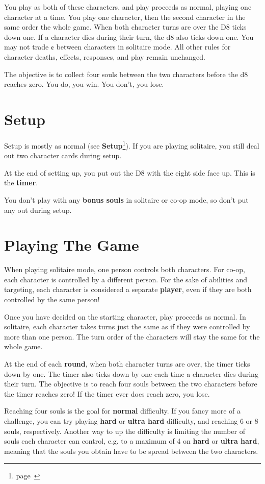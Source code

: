 \documentclass[
  fontsize=10pt,
  paper=a5,
  version=last,
  chapterprefix=true,
  bindingoffset=5mm,
  ]{scrbook}
\begin{document}
    You play as both of these characters, and play proceeds as normal, playing one character at a time. You play one character, then the second character in the same order the whole game. When both character turns are over the D8 ticks down one. If a character dies during their turn, the d8 also ticks down one. You may not trade ¢ between characters in solitaire mode. All other rules for character deaths, effects, responses, and play remain unchanged.

    The objective is to collect four souls between the two characters before the d8 reaches zero. You do, you win. You don’t, you lose.
    \section{Setup}
    Setup is mostly as normal (see \textbf{Setup}\footnote{page~\pageref{setup}}). If you are playing solitaire, you still deal out two character cards during setup.

    At the end of setting up, you put out the D8 with the eight side face up. This is the \textbf{timer}.

    You don’t play with any \textbf{bonus souls} in solitaire or co-op mode, so don’t put any out during setup.
    \section{Playing The Game}
    When playing solitaire mode, one person controls both characters. For co-op, each character is controlled by a different person. For the sake of abilities and targeting, each character is considered a separate \textbf{player}, even if they are both controlled by the same person!

    Once you have decided on the starting character, play proceeds as normal. In solitaire, each character takes turns just the same as if they were controlled by more than one person. The turn order of the characters will stay the same for the whole game.

    At the end of each \textbf{round}, when both character turns are over, the timer ticks down by one. The timer also ticks down by one each time a character dies during their turn. The objective is to reach four souls between the two characters before the timer reaches zero! If the timer ever does reach zero, you lose.

    Reaching four souls is the goal for \textbf{normal} difficulty. If you fancy more of a challenge, you can try playing \textbf{hard} or \textbf{ultra hard} difficulty, and reaching 6 or 8 souls, respectively. Another way to up the difficulty is limiting the number of souls each character can control, e.g. to a maximum of 4 on \textbf{hard} or \textbf{ultra hard}, meaning that the souls you obtain have to be spread between the two characters.
\end{document}

